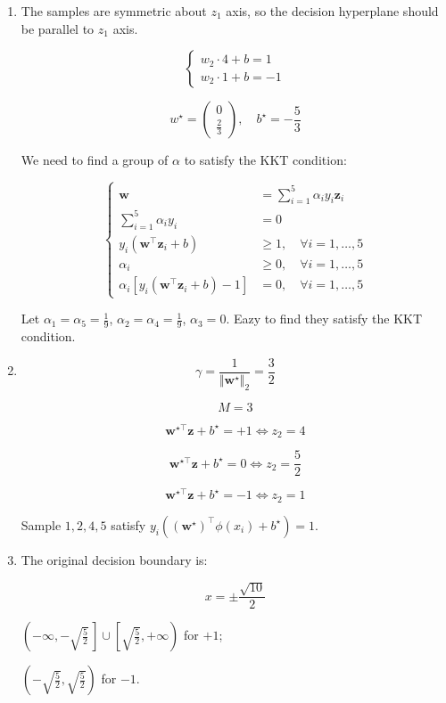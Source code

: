 \documentclass[11pt]{article}
\begin{document}
\begin{enumerate}
    \item[1. ]
    
    The samples are symmetric about $z_1$ axis, so the decision hyperplane should be parallel to $z_1$ axis.

    $$
    \begin{cases}
        w_2 \cdot 4 + b = 1 \\
        w_2 \cdot 1 + b = -1
    \end{cases}
    $$

    $$
    w^\star
    =
    \begin{pmatrix}
        0 \\
        \frac{2}{3}
    \end{pmatrix}
    , \quad
    b^\star = -\frac{5}{3}
    $$

    We need to find a group of $\alpha$ to satisfy the KKT condition:

    $$
    \begin{cases}
        \mathbf{w} &= \sum_{i=1}^5 \alpha_i y_i \mathbf{z}_i \\
        \sum_{i=1}^5 \alpha_i y_i &= 0 \\
        y_i(\mathbf{w}^\top \mathbf{z}_i + b) &\ge 1, \quad \forall i=1,\dots,5 \\
        \alpha_i &\ge 0, \quad \forall i=1,\dots,5 \\
        \alpha_i \left[ y_i(\mathbf{w}^\top \mathbf{z}_i + b) - 1 \right] &= 0, \quad \forall i=1,\dots,5
    \end{cases}
    $$

    Let $\alpha_1 = \alpha_5 = \frac{1}{9}$, $\alpha_2 = \alpha_4 = \frac{1}{9}$, $\alpha_3 = 0$. Eazy to find they satisfy the KKT condition.

    \item[2. ]
    
    $$
    \gamma = \frac{1}{\Vert \mathbf{w}^\star\Vert _2} = \frac{3}{2}
    $$

    $$
    M = 3
    $$

    $$
    \mathbf{w}^{\star\top} \mathbf{z} + b^\star = +1 \iff z_2 = 4
    $$

    $$
    \mathbf{w}^{\star\top} \mathbf{z} + b^\star = 0 \iff z_2 = \frac{5}{2}
    $$

    $$
    \mathbf{w}^{\star\top} \mathbf{z} + b^\star = -1 \iff z_2 = 1
    $$

    Sample $1, 2, 4, 5$ satisfy $y_i((\mathbf{w}^\star)^\top \phi(x_i) + b^\star) = 1$.

    \item[3. ]

    The original decision boundary is:
    
    $$
    x = \pm \frac{\sqrt{10}}{2}
    $$

    $\left(-\infty, -\sqrt{\frac{5}{2}}\,\right] \cup \left[\sqrt{\frac{5}{2}}, +\infty\right)$ for $+1$;

    $\left(-\sqrt{\frac{5}{2}}, \sqrt{\frac{5}{2}}\right)$ for $-1$.
\end{enumerate}
\end{document}
